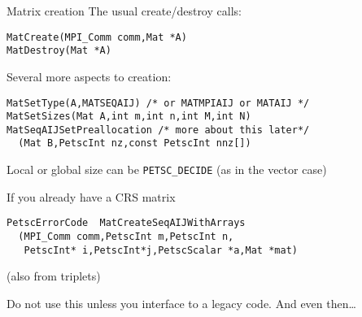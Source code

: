 


\begin{numberedframe}{Matrix creation}
\small
The usual create/destroy calls:
\begin{lstlisting}
MatCreate(MPI_Comm comm,Mat *A)
MatDestroy(Mat *A)
\end{lstlisting}
Several more aspects to creation:
\begin{lstlisting}
MatSetType(A,MATSEQAIJ) /* or MATMPIAIJ or MATAIJ */
MatSetSizes(Mat A,int m,int n,int M,int N)
MatSeqAIJSetPreallocation /* more about this later*/
  (Mat B,PetscInt nz,const PetscInt nnz[])
\end{lstlisting}
Local or global size can be \lstinline{PETSC_DECIDE} (as in the vector case)
\end{numberedframe}

\begin{numberedframe}{If you already have a CRS matrix}
\begin{lstlisting}
PetscErrorCode  MatCreateSeqAIJWithArrays
  (MPI_Comm comm,PetscInt m,PetscInt n,
   PetscInt* i,PetscInt*j,PetscScalar *a,Mat *mat)
\end{lstlisting}
(also from triplets)

Do not use this unless you interface to a legacy code. And even then\ldots
\end{numberedframe}

